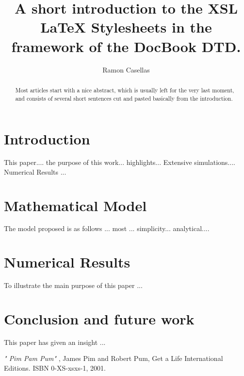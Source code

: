\documentclass[english,a4paper]{article}
\title{A short introduction to the XSL LaTeX Stylesheets in the framework of the DocBook DTD.}
\author{Ramon Casellas}
\begin{document}
\maketitle

\begin{abstract}

 Most articles start with a nice abstract, which is usually left for 
the very last moment, and consists of several short sentences cut and
pasted basically from the introduction.

\end{abstract}


\section{Introduction}
\label{id2718269}\hypertarget{id2718269}{}%

 This paper.... the purpose of this work... highlights...
Extensive simulations.... Numerical Results ...


\section{Mathematical Model}
\label{id2718407}\hypertarget{id2718407}{}%

 The model proposed is as follows ... most ... simplicity...
analytical....


\section{Numerical Results}
\label{id2718420}\hypertarget{id2718420}{}%

 To illustrate the main purpose of this paper ... 

\section{Conclusion and future work}
\label{id2718431}\hypertarget{id2718431}{}%

This paper has given an insight ... 
%	
%	

\begin{thebibliography}{WIDELABEL}

\emph{" Pim Pam Pum"} , James Pim and Robert Pum, Get a Life International Editions. ISBN 0-XS-xsxs-1, 2001. \label{PimPum}


\end{thebibliography}

\end{document}
